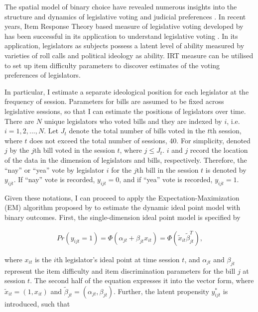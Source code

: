 The spatial model of binary choice have revealed numerous insights into the structure and dynamics of legislative voting \citep[][]{Carroll2013,Clinton2004,Cox2002b, McCarty2001,McCarty2006,Snyder2001,Poole1997,Poole2007,Jackman2001,Tsai2020,Gray2019} and judicial preferences \citep[][]{Epstein2007,Martin2002,Martin2007}. In recent years, Item Response Theory based measure of legislative
voting developed by \textcite{Clinton2004} has been successful in
its application to understand legislative voting \citep[e.g.][]{Zucco2011, Tsai2020, Gray2019}. In its application, legislators as subjects possess a latent level of ability measured by varieties of roll calls and political ideology as ability. IRT measure can be utilised to set up item difficulty parameters to discover estimates of the voting preferences of legislators.

In particular, I estimate a separate ideological position for each legislator at the frequency of session. Parameters for bills are assumed
to be fixed across legislative sessions, so that I can estimate the positions of legislators over time. There are $N$ unique legislators
who voted bills and they are indexed by $i$, i.e. $i=1,2,...,N$. Let $J_{t}$ denote the total number of bills voted in the $t$th session, where $t$ does not exceed the total number of sessions, 40. For simplicity, denoted $j$ by the $j$th bill voted in the session $t$, where $j\leq J_{t}$. $i$ and $j$ record the location of the data in the dimension of legislators and bills, respectively. Therefore, the ``nay'' or ``yea'' vote by legislator $i$ for the $j$th bill in the session $t$ is denoted by $y_{ijt}$. If ``nay'' vote is recorded, $y_{ijt}=0$, and if ``yea'' vote is recorded, $y_{ijt}=1$. 

Given these notations, I can proceed to apply the Expectation-Maximization (EM) algorithm proposed by \citet{Imai2016} to estimate the dynamic ideal point model with binary outcomes. First, the single-dimension ideal point model is specified by

\begin{equation}
\begin{aligned}
Pr(y_{ijt}=1)=\Phi(\alpha_{jt}+\beta_{jt}x_{it})=\Phi(\tilde{x}_{it}\tilde{\beta}_{jt}^{T}),
\end{aligned}
\end{equation}

\noindent where $x_{it}$ is the $i$th legislator's ideal point at time session $t$, and $\alpha_{jt}$ and $\beta_{jt}$ represent the item difficulty and item discrimination parameters for the bill $j$ at session $t$. The second half of the equation expresses it into the vector form, where $\tilde{x}_{it}=(1,x_{it})$ and $\tilde{\beta}_{jt}=(\alpha_{jt},\beta_{jt})$. Further, the latent propensity $y_{ijt}^{*}$ is introduced, such that 

